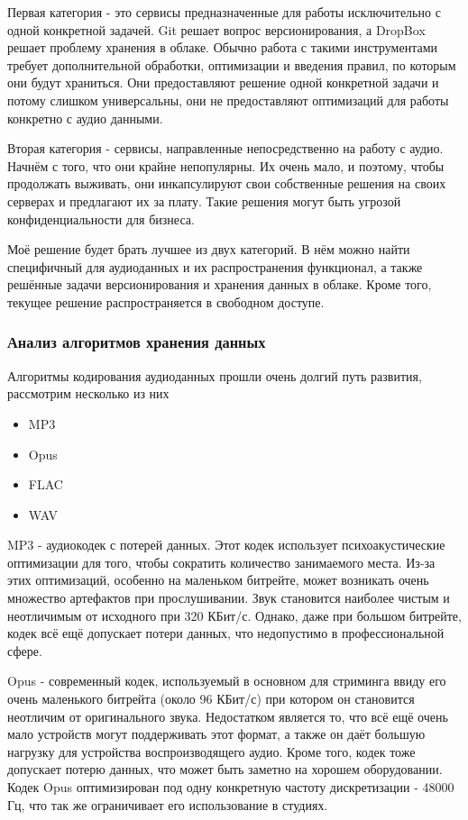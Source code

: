 \documentclass[a4paper, 12pt, oneside]{article}
\begin{document}
Первая категория - это сервисы предназначенные для работы исключительно с одной конкретной задачей. Git решает вопрос версионирования, а DropBox решает проблему 
хранения в облаке. Обычно работа с такими инструментами требует дополнительной обработки, оптимизации и введения правил, по которым они
будут храниться. Они предоставляют решение одной конкретной задачи и потому слишком универсальны, они не предоставляют
оптимизаций для работы конкретно с аудио данными.

Вторая категория - сервисы, направленные непосредственно на работу с аудио. Начнём с того, что они крайне непопулярны. Их очень мало, и 
поэтому, чтобы продолжать выживать, они инкапсулируют свои собственные решения на своих серверах и предлагают их за плату. 
Такие решения могут быть угрозой конфиденциальности для бизнеса.

Моё решение будет брать лучшее из двух категорий. В нём можно найти специфичный для аудиоданных и их распространения функционал, а также
решённые задачи версионирования и хранения данных в облаке. Кроме того, текущее решение распространяется в свободном доступе.

\subsubsection{Анализ алгоритмов хранения данных}

Алгоритмы кодирования аудиоданных прошли очень долгий путь развития, рассмотрим несколько из них

\begin{itemize}[label=$\bullet$]
	\item MP3
	\item Opus
	\item FLAC
	\item WAV
\end{itemize}

MP3 - аудиокодек с потерей данных. Этот кодек использует психоакустические оптимизации для того, чтобы сократить количество 
занимаемого места. Из-за этих оптимизаций, особенно на маленьком битрейте, может возникать очень множество артефактов при 
прослушивании. Звук становится наиболее чистым и неотличимым от исходного при 320 КБит/с. Однако, даже при большом битрейте, кодек всё ещё 
допускает потери данных, что недопустимо в профессиональной сфере.

Opus - современный кодек, используемый в основном для стриминга ввиду его очень маленького битрейта (около 96 КБит/с) при котором он становится 
неотличим от оригинального звука. Недостатком является то, что всё ещё очень мало устройств могут поддерживать этот формат, 
а также он даёт большую нагрузку для устройства воспроизводящего аудио. Кроме того, кодек тоже допускает потерю данных, что может быть
заметно на хорошем оборудовании. Кодек Opus оптимизирован под одну конкретную частоту дискретизации - 48000 Гц, что так же ограничивает
его использование в студиях.
\end{document}
